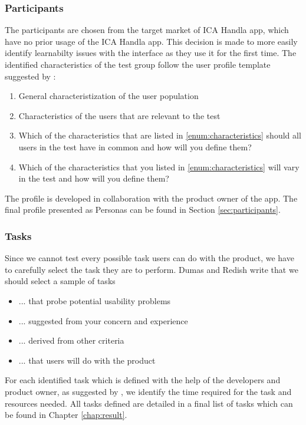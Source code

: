 \subsubsection{Participants}
\label{subsubsec:participants}
The participants are chosen from the target market of ICA Handla app, which have no prior usage of the ICA Handla app. This decision is made to more easily identify learnabilty issues with the interface as they use it for the first time. The identified characteristics of the test group follow the user profile template suggested by \cite{Dumas1999}:

\begin{enumerate}
  \item General characteristization of the user population
  \item \label{enum:characteristics}Characteristics of the users that are relevant to the test
  \item Which of the characteristics that are listed in \ref{enum:characteristics} should all users in the test have in common and how will you define them?
  \item Which of the characteristics that you listed in \ref{enum:characteristics} will vary in the test and how will you define them?
\end{enumerate}

The profile is developed in collaboration with the product owner of the app. The final profile presented as Personas can be found in Section \ref{sec:participants}.

\subsubsection{Tasks}
\label{subsubsec:tasks}

Since we cannot test every possible task users can do with the product, we have to carefully select the task they are to perform. Dumas and Redish \cite{Dumas1999} write that we should select a sample of tasks
\begin{itemize}[noitemsep]
  \item ... that probe potential usability problems
  \item ... suggested from your concern and experience
  \item ... derived from other criteria
  \item ... that users will do with the product
\end{itemize}

For each identified task which is defined with the help of the developers and product owner, as suggested by \cite{Dumas1999}, we identify the time required for the task and resources needed. All tasks defined are detailed in a final list of tasks which can be found in Chapter \ref{chap:result}.

